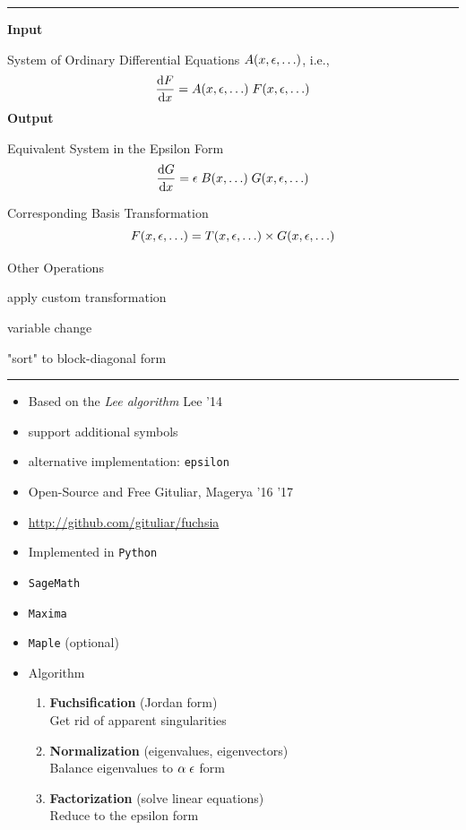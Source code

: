 \documentclass[11pt]{article}
\newcommand{\titleb}[2]{{\color{Blue}{\LARGE #1}\hfill{\Large #2}\vspace{-2mm}\par\rule{\textwidth}{1pt}\vs}}
\newcommand{\titlea}[1]{\titleb{#1}{}}
\newcommand{\people}[1]{{\color{Magenta}#1}}
\begin{document}
\titlea{II. A few words on \fuchsia}
  {\bf Input}
  \bi
    \item System of Ordinary Differential Equations $A(x,\epsilon,\ldots)$, i.e.,
      $$\frac{\mathrm{d} F}{\mathrm{d} x} = A(x,\epsilon,\ldots) \; F(x,\epsilon,\ldots)$$%
  \ei
  {\bf Output}
  \bi
    \item Equivalent System in the Epsilon Form
      $$\frac{\mathrm{d} G}{\mathrm{d} x} = \epsilon \; B(x,\ldots) \; G(x,\epsilon,\ldots)$$
    \item Corresponding Basis Transformation 
      $$F(x,\epsilon,\ldots) = T(x,\epsilon,\ldots) \times G(x,\epsilon,\ldots)$$
    \item Other Operations
    \bi
      \item apply custom transformation
      \item variable change
      \item "sort" to block-diagonal form
    \ei
  \ei
\newpage


\titlea{II. A few words on \fuchsia}
  \begin{itemize}
    \item Based on the {\em Lee algorithm} \people{Lee '14}
    \bi
      \item support additional symbols
      \item alternative implementation: \texttt{epsilon}
    \ei
    \item Open-Source and Free \people{Gituliar, Magerya '16 '17}
    \bi
       \item \url{http://github.com/gituliar/fuchsia}
    \ei
    \item Implemented in \texttt{Python}
    \bi
      \item \texttt{SageMath}
      \item \texttt{Maxima}
      \item \texttt{Maple} (optional)
    \ei
    \item Algorithm
    \begin{enumerate}
      \item {\bf Fuchsification} (Jordan form) \\
        Get rid of apparent singularities
      \item {\bf Normalization} (eigenvalues, eigenvectors) \\
        Balance eigenvalues to $\alpha \; \epsilon$ form
      \item {\bf Factorization} (solve linear equations) \\
        Reduce to the epsilon form
    \end{enumerate}
  \end{itemize}
\newpage
\end{document}
